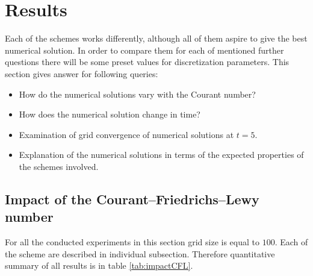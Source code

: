 \section{Results} \label{sec:results}
	Each of the schemes works differently, although all of them aspire to give the best numerical solution. In order to compare them for each of mentioned further questions there will be some preset values for discretization parameters.
	This section gives answer for following queries:
	
	\begin{itemize}
		\item How do the numerical solutions vary with the Courant number?
		\item How does the numerical solution change in time?
		\item Examination of grid convergence of numerical solutions at $t=5$.
		\item Explanation of the numerical solutions in terms of the expected properties of the schemes involved.
	\end{itemize}

	\subsection{Impact of the Courant–Friedrichs–Lewy number} \label{sec:impactCFL}
		For all the conducted experiments in this section grid size is equal to $100$. Each of the scheme are described in individual subsection. Therefore quantitative summary of all results is in table \ref{tab:impactCFL}.
		
		
		
		
		
	